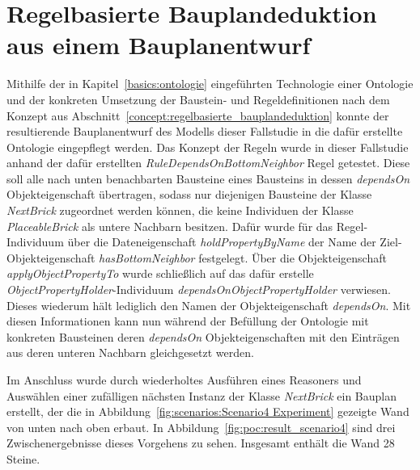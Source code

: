 \section{Regelbasierte Bauplandeduktion aus einem Bauplanentwurf}
Mithilfe der in Kapitel~\ref{basics:ontologie} eingeführten Technologie einer Ontologie und der konkreten Umsetzung der Baustein- und Regeldefinitionen nach dem Konzept aus Abschnitt~\ref{concept:regelbasierte_bauplandeduktion} 
konnte der resultierende Bauplanentwurf des Modells dieser Fallstudie in die dafür erstellte Ontologie eingepflegt werden.
Das Konzept der Regeln wurde in dieser Fallstudie anhand der dafür erstellten \textit{RuleDependsOnBottomNeighbor} Regel getestet.
Diese soll alle nach unten benachbarten Bausteine eines Bausteins in dessen \textit{dependsOn} Objekteigenschaft übertragen, sodass nur diejenigen Bausteine der Klasse \textit{NextBrick} zugeordnet werden können, die keine Individuen der Klasse \textit{PlaceableBrick} als untere Nachbarn besitzen.
Dafür wurde für das Regel-Individuum über die Dateneigenschaft \textit{holdPropertyByName} der Name der Ziel-Objekteigenschaft \textit{hasBottomNeighbor} festgelegt.
Über die Objekteigenschaft \textit{applyObjectPropertyTo} wurde schließlich auf das dafür erstelle \textit{ObjectPropertyHolder}-Individuum \textit{dependsOnObjectPropertyHolder} verwiesen.
Dieses wiederum hält lediglich den Namen der Objekteigenschaft \textit{dependsOn}.
Mit diesen Informationen kann nun während der Befüllung der Ontologie mit konkreten Bausteinen deren \textit{dependsOn} Objekteigenschaften mit den Einträgen aus deren unteren Nachbarn gleichgesetzt werden.

Im Anschluss wurde durch wiederholtes Ausführen eines Reasoners und Auswählen einer zufälligen nächsten Instanz der Klasse \textit{NextBrick} ein Bauplan erstellt, der die in Abbildung~\ref{fig:scenarios:Scenario4 Experiment} gezeigte Wand von unten nach oben erbaut.
In Abbildung~\ref{fig:poc:result_scenario4} sind drei Zwischenergebnisse dieses Vorgehens zu sehen.
Insgesamt enthält die Wand 28 Steine.

